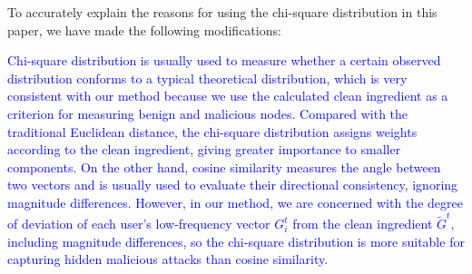 \documentclass[a4paper,twoside,11pt,dvipsnames]{reviewresponse}
\begin{document}
To accurately explain the reasons for using the chi-square distribution in this paper, we have made the following modifications:


\textcolor{blue}{
Chi-square distribution is usually used to measure whether a certain observed distribution conforms to a typical theoretical distribution, which is very consistent with our method because we use the calculated clean ingredient as a criterion for measuring benign and malicious nodes. Compared with the traditional Euclidean distance, the chi-square distribution assigns weights according to the clean ingredient, giving greater importance to smaller components. On the other hand, cosine similarity measures the angle between two vectors and is usually used to evaluate their directional consistency, ignoring magnitude differences. However, in our method, we are concerned with the degree of deviation of each user's low-frequency vector $G_i^t$ from the clean ingredient $\tilde{G}^t$, including magnitude differences, so the chi-square distribution is more suitable for capturing hidden malicious attacks than cosine similarity.
}
\end{document}
